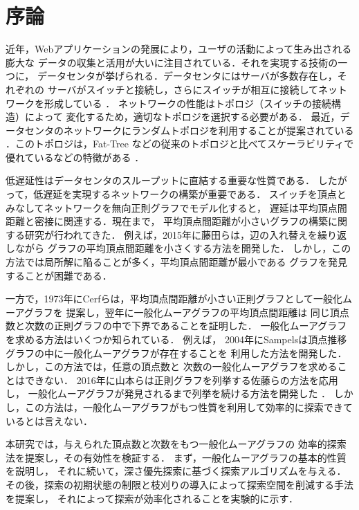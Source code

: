 
\chapter{序論}
近年，Webアプリケーションの発展により，ユーザの活動によって生み出される膨大な
データの収集と活用が大いに注目されている．それを実現する技術の一つに，
データセンタが挙げられる．データセンタにはサーバが多数存在し，それぞれの
サーバがスイッチと接続し，さらにスイッチが相互に接続してネットワークを形成している
\cite{Greenberg2009,Al-Fares2008}．
ネットワークの性能はトポロジ（スイッチの接続構造）によって
変化するため，適切なトポロジを選択する必要がある．
最近，データセンタのネットワークにランダムトポロジを利用することが提案されている
\cite{Singla2011,Koibuchi2012}．このトポロジは，Fat-Tree\cite{Al-Fares2008}
などの従来のトポロジと比べてスケーラビリティで優れているなどの特徴がある
\cite{Singla2011}．

低遅延性はデータセンタのスループットに直結する重要な性質である．
したがって，低遅延を実現するネットワークの構築が重要である．
スイッチを頂点とみなしてネットワークを無向正則グラフでモデル化すると，
遅延は平均頂点間距離と密接に関連する．現在まで，
平均頂点間距離が小さいグラフの構築に関する研究が行われてきた．
例えば，2015年に藤田らは，辺の入れ替えを繰り返しながら
グラフの平均頂点間距離を小さくする方法を開発した\cite{Fujita2015}．
しかし，この方法では局所解に陥ることが多く，平均頂点間距離が最小である
グラフを発見することが困難である．

一方で，1973年にCerfらは，平均頂点間距離が小さい正則グラフとして一般化ムーアグラフを
提案し\cite{Cerf1973}，翌年に一般化ムーアグラフの平均頂点間距離は
同じ頂点数と次数の正則グラフの中で下界であることを証明した\cite{Cerf1974Lower}．
一般化ムーアグラフを求める方法はいくつか知られている．
例えば，
{\color{red}
  2004年にSampelsは頂点推移グラフの中に一般化ムーアグラフが存在することを
  利用した方法を開発した\cite{Sampels2004}．しかし，この方法では，任意の頂点数と
  次数の一般化ムーアグラフを求めることはできない．
}
2016年に山本らは正則グラフを列挙する佐藤らの方法\cite{Sato2008}を応用し，
一般化ムーアグラフが発見されるまで列挙を続ける方法を開発した
\cite{Yamamoto2016}．
しかし，この方法は，一般化ムーアグラフがもつ性質を利用して効率的に探索できて
いるとは言えない．

本研究では，与えられた頂点数と次数をもつ一般化ムーアグラフの
効率的探索法を提案し，その有効性を検証する．
まず，一般化ムーアグラフの基本的性質を説明し，
それに続いて，深さ優先探索に基づく探索アルゴリズムを与える．
その後，探索の初期状態の制限と枝刈りの導入によって探索空間を削減する手法を提案し，
それによって探索が効率化されることを実験的に示す．
